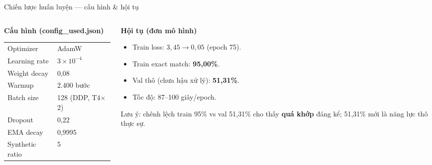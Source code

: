 \documentclass[aspectratio=169,9pt]{beamer}
\begin{document}
\begin{frame}{Chiến lược huấn luyện --- cấu hình \& hội tụ}
\begin{columns}[T]
\begin{column}{0.48\textwidth}
\textbf{Cấu hình (config\_used.json)}
\begin{table}\centering\scriptsize
\begin{tabular}{ll}
\toprule
Optimizer & AdamW \\
Learning rate & \(3\times10^{-4}\) \\
Weight decay & 0,08 \\
Warmup & 2.400 bước \\
Batch size & 128 (DDP, T4\(\times\)2) \\
Dropout & 0,22 \\
EMA decay & 0,9995 \\
Synthetic ratio & 5 \\
\bottomrule
\end{tabular}
\end{table}
\end{column}
\begin{column}{0.52\textwidth}
\textbf{Hội tụ (đơn mô hình)}
\begin{itemize}\footnotesize
  \item Train loss: \(3{,}45 \to 0{,}05\) (epoch 75).
  \item Train exact match: \textbf{95,00\%}.
  \item Val thô (chưa hậu xử lý): \textbf{51,31\%}.
  \item Tốc độ: 87--100 giây/epoch.
\end{itemize}
\smallskip
\footnotesize\alert{Lưu ý:} chênh lệch train 95\% vs val 51,31\% cho thấy \textbf{quá khớp} đáng kể; 51,31\% mới là năng lực thô thực sự.
\end{column}
\end{columns}
\end{frame}
\end{document}
